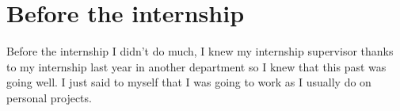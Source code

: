 \section{Before the internship}
Before the internship I didn't do much, I knew my internship supervisor
thanks to my internship last year in another department so I knew that
this past was going well. I just said to myself that I was going to
work as I usually do on personal projects.